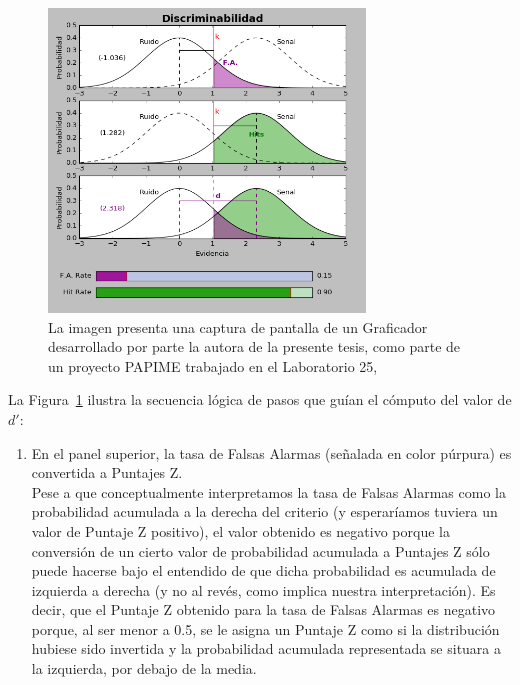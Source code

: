 \begin{itemize}
\begin{figure}[th]
\centering
\includegraphics[width=0.75\textwidth]{Figures/Graficador_Discriminabilidad} 
\caption[Estimación de la discriminabilidad con base en las Tasas de Ejecución]{La imagen presenta una captura de pantalla de un Graficador desarrollado por parte la autora de la presente tesis, como parte de un proyecto PAPIME trabajado en el Laboratorio 25, \parencite{PAPIME}}
\label{fig:Graf_Discrim}
\end{figure}

La Figura~\ref{fig:Graf_Discrim} ilustra la secuencia lógica de pasos que guían el cómputo del valor de $d'$:\\

\begin{enumerate}
\item En el panel superior, la tasa de Falsas Alarmas (señalada en color púrpura) es convertida a Puntajes Z.\\

Pese a que conceptualmente interpretamos la tasa de Falsas Alarmas como la probabilidad acumulada a la derecha del criterio (y esperaríamos tuviera un valor de Puntaje Z positivo), el valor obtenido es negativo porque la conversión de un cierto valor de probabilidad acumulada a Puntajes Z sólo puede hacerse bajo el entendido de que dicha probabilidad es acumulada de izquierda a derecha (y no al revés, como implica nuestra interpretación). Es decir, que el Puntaje Z obtenido para la tasa de Falsas Alarmas es negativo porque, al ser menor a 0.5, se le asigna un Puntaje Z como si la distribución hubiese sido invertida y la probabilidad acumulada representada se situara a la izquierda, por debajo de la media.\\


\end{enumerate}
\end{itemize}
